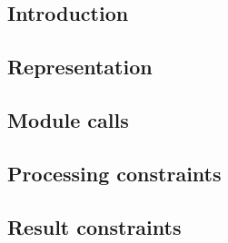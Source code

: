 \subsection{Introduction}                    \label{block hash: processing: introduction}             
\subsection{Representation}                  \label{block hash: processing: representation}           
\subsection{Module calls}                    \label{block hash: processing: module calls}             
\subsection{Processing constraints}          \label{block hash: processing: processing constraints}   
\subsection{Result constraints}              \label{block hash: processing: result constraints}       
